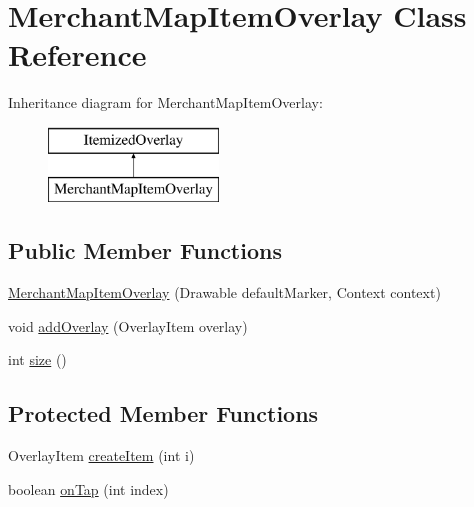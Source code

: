 \hypertarget{classapp_1_1localization_1_1_merchant_map_item_overlay}{\section{Merchant\-Map\-Item\-Overlay Class Reference}
\label{classapp_1_1localization_1_1_merchant_map_item_overlay}
}
Inheritance diagram for Merchant\-Map\-Item\-Overlay\-:\begin{figure}[H]
\begin{center}
\leavevmode
\includegraphics[height=2.000000cm]{classapp_1_1localization_1_1_merchant_map_item_overlay}
\end{center}
\end{figure}
\subsection*{Public Member Functions}
\begin{DoxyCompactItemize}
\item 
\hyperlink{classapp_1_1localization_1_1_merchant_map_item_overlay_ada6191ca0384ce6901b89219a91b948a}{Merchant\-Map\-Item\-Overlay} (Drawable default\-Marker, Context context)
\item 
void \hyperlink{classapp_1_1localization_1_1_merchant_map_item_overlay_a965b6785d735fc872f51144676deb992}{add\-Overlay} (Overlay\-Item overlay)
\item 
int \hyperlink{classapp_1_1localization_1_1_merchant_map_item_overlay_af4b57d21919c42d55af03391f91a1c08}{size} ()
\end{DoxyCompactItemize}
\subsection*{Protected Member Functions}
\begin{DoxyCompactItemize}
\item 
Overlay\-Item \hyperlink{classapp_1_1localization_1_1_merchant_map_item_overlay_a997a8009414b6615377dbfcf7a481484}{create\-Item} (int i)
\item 
boolean \hyperlink{classapp_1_1localization_1_1_merchant_map_item_overlay_a623b412bd9c0c2f961d18d3aaf6e8c1c}{on\-Tap} (int index)
\end{DoxyCompactItemize}


